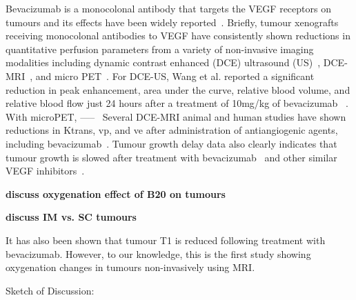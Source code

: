 Bevacizumab is a monocolonal antibody that targets the VEGF receptors on tumours and its effects have been widely reported~\cite{refs}.
Briefly, tumour xenografts receiving monocolonal antibodies to VEGF have consistently shown reductions in quantitative perfusion parameters from a variety of non-invasive imaging modalities including dynamic contrast enhanced (DCE) ultrasound (US)~\cite{Wang:2015bb}, DCE-MRI~\cite{OConnor:2009cg}, and micro PET~\cite{Nagengast:2007hx}.
For DCE-US, Wang et al. reported a significant reduction in peak enhancement, area under the curve, relative blood volume, and relative blood flow just 24 hours after a treatment of 10mg/kg of bevacizumab~\cite{Wang:2015bb} .  
With microPET, -----~
Several DCE-MRI animal and human studies have shown reductions in Ktrans, vp, and ve after administration of antiangiogenic agents, including bevacizumab~\cite{mri}. 
Tumour growth delay data also clearly indicates that tumour growth is slowed after treatment with bevacizumab~\cite{growthdelay:junyang} and other similar VEGF inhibitors~\cite{sunitinib}.

\textbf{discuss oxygenation effect of B20 on tumours}


\textbf{discuss IM vs. SC tumours}


\textbf{}





It has also been shown that tumour T1 is reduced following treatment with bevacizumab. 
However, to our knowledge, this is the first study showing oxygenation changes in tumours non-invasively using MRI. 


Sketch of Discussion:

